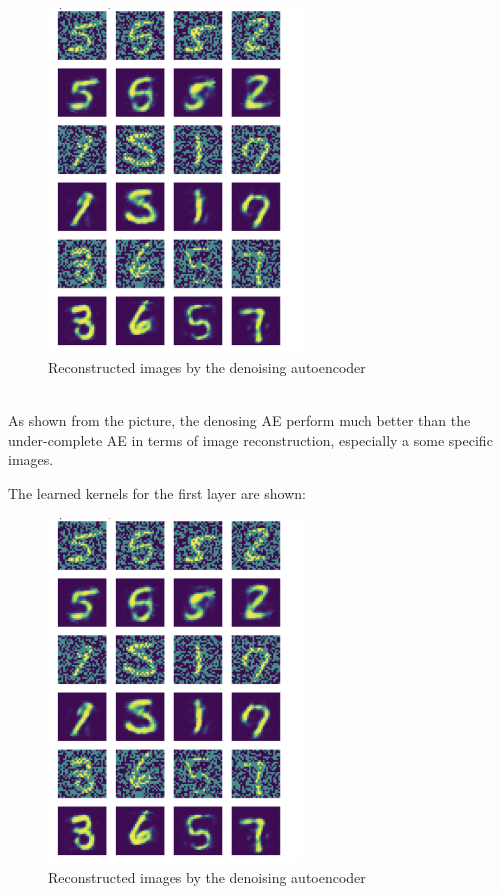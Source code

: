 \begin{figure}[H]
    \centering
    \includegraphics[width=0.6\textwidth]{labs/10/images/Denoising_AE.png}
    \caption{Reconstructed images by the denoising autoencoder}
    \label{fig:Denosing Autoencoder}
\end{figure}
\\

As shown from the picture, the denosing AE perform much better than the under-complete AE in terms of image reconstruction, especially a some specific images.

The learned kernels for the first layer are shown: 

\begin{figure}[H]
    \centering
    \includegraphics[width=0.6\textwidth]{labs/10/images/Denoising_AE.png}
    \caption{Reconstructed images by the denoising autoencoder}
    \label{fig:Denoising AE kernels}
\end{figure}
\\

